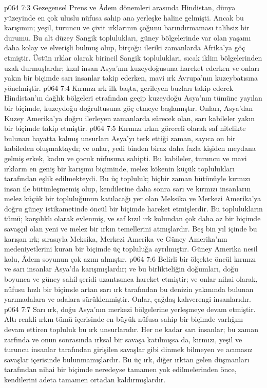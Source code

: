 \vs p064 7:3 Gezegensel Prens ve Âdem dönemleri arasında Hindistan, dünya yüzeyinde en çok uluslu nüfusa sahip ana yerleşke haline gelmişti. Ancak bu karışımın; yeşil, turuncu ve çivit ırklarının çoğunu barındırmaması talihsiz bir durumu. Bu alt düzey Sangik toplulukları, güney bölgelerinde var olan yaşamı daha kolay ve elverişli bulmuş olup, birçoğu ileriki zamanlarda Afrika’ya göç etmiştir. Üstün ırklar olarak birincil Sangik toplulukları, sıcak iklim bölgelerinden uzak durmuşlardır; kızıl insan Asya’nın kuzeydoğusuna hareket ederken ve onları yakın bir biçimde sarı insanlar takip ederken, mavi ırk Avrupa’nın kuzeybatısına yönelmiştir.
\vs p064 7:4 Kırmızı ırk ilk başta, gerileyen buzları takip ederek Hindistan’ın dağlık bölgeleri etrafından geçip kuzeydoğu Asya’nın tümüne yayılan bir biçimde, kuzeydoğu doğrultusuna göç etmeye başlamıştır. Onları, Asya’dan Kuzey Amerika’ya doğru ilerleyen zamanlarda sürecek olan, sarı kabileler yakın bir biçimde takip etmiştir.
\vs p064 7:5 Kırmızı ırkın göreceli olarak saf nitelikte bulunan hayatta kalmış unsurları Asya’yı terk ettiği zaman, sayıca on bir kabileden oluşmaktaydı; ve onlar, yedi binden biraz daha fazla kişiden meydana gelmiş erkek, kadın ve çocuk nüfusuna sahipti. Bu kabileler, turuncu ve mavi ırkların en geniş bir karışımı biçiminde, melez kökenin küçük toplulukları tarafından eşlik edilmekteydi. Bu üç topluluk; hiçbir zaman bütünüyle kırmızı insan ile bütünleşmemiş olup, kendilerine daha sonra sarı ve kırmızı insanların melez küçük bir topluluğunun katılacağı yer olan Meksika ve Merkezi Amerika’ya doğru güney istikametinde öncül bir biçimde hareket etmişlerdir. Bu toplulukların tümü; karşılıklı olarak evlenmiş, ve saf kızıl ırk kolundan çok daha az bir biçimde savaşçıl olan yeni ve melez bir ırkın temellerini atmışlardır. Beş bin yıl içinde bu karışan ırk; sırasıyla Meksika, Merkezi Amerika ve Güney Amerika’nın medeniyetlerini kuran bir biçimde üç topluluğa ayrılmıştır. Güney Amerika nesil kolu, Âdem soyunun çok azını almıştır.
\vs p064 7:6 Belirli bir ölçekte öncül kırmızı ve sarı insanlar Asya’da karışmışlardır; ve bu birlikteliğin doğumları, doğu boyunca ve güney sahil şeridi uzantısınca hareket etmiştir; ve onlar nihai olarak, nüfusu hızlı bir biçimde artan sarı ırk tarafından bu denizin yakınında bulunan yarımadalara ve adalara sürüklenmiştir. Onlar, çağdaş kahverengi insanlarıdır.
\vs p064 7:7 Sarı ırk, doğu Asya’nın merkezi bölgelerine yerleşmeye devam etmiştir. Altı renkli ırkın tümü içerisinde en büyük nüfusa sahip bir biçimde varlığını devam ettiren topluluk bu ırk unsurlarıdır. Her ne kadar sarı insanlar; bu zaman zarfında ve onun sonrasında ırksal bir savaşa katılmışsa da, kırmızı, yeşil ve turuncu insanlar tarafından girişilen savaşlar gibi dinmek bilmeyen ve acımasız savaşlar içerisinde bulunmamışlardır. Bu üç ırk, diğer ırktan gelen düşmanları tarafından nihai bir biçimde neredeyse tamamen yok edilmelerinden önce, kendilerini adeta tamamen ortadan kaldırmışlardır.

